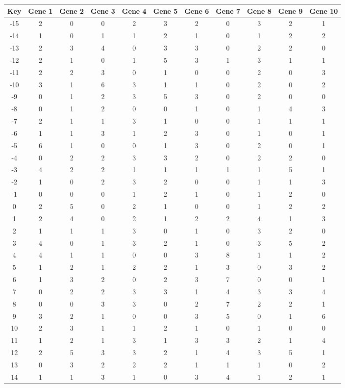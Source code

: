 \begin{tabular}{|c|c|c|c|c|c|c|c|c|c|c|}
\hline
Key & Gene 1 & Gene 2 & Gene 3 & Gene 4 & Gene 5 & Gene 6 & Gene 7 & Gene 8 & Gene 9 & Gene 10 \\
\hline
-15 & 2 & 0 & 0 & 2 & 3 & 2 & 0 & 3 & 2 & 1 \\
-14 & 1 & 0 & 1 & 1 & 2 & 1 & 0 & 1 & 2 & 2 \\
-13 & 2 & 3 & 4 & 0 & 3 & 3 & 0 & 2 & 2 & 0 \\
-12 & 2 & 1 & 0 & 1 & 5 & 3 & 1 & 3 & 1 & 1 \\
-11 & 2 & 2 & 3 & 0 & 1 & 0 & 0 & 2 & 0 & 3 \\
-10 & 3 & 1 & 6 & 3 & 1 & 1 & 0 & 2 & 0 & 2 \\
-9 & 0 & 1 & 2 & 3 & 5 & 3 & 0 & 2 & 0 & 0 \\
-8 & 0 & 1 & 2 & 0 & 0 & 1 & 0 & 1 & 4 & 3 \\
-7 & 2 & 1 & 1 & 3 & 1 & 0 & 0 & 1 & 1 & 1 \\
-6 & 1 & 1 & 3 & 1 & 2 & 3 & 0 & 1 & 0 & 1 \\
-5 & 6 & 1 & 0 & 0 & 1 & 3 & 0 & 2 & 0 & 1 \\
-4 & 0 & 2 & 2 & 3 & 3 & 2 & 0 & 2 & 2 & 0 \\
-3 & 4 & 2 & 2 & 1 & 1 & 1 & 1 & 1 & 5 & 1 \\
-2 & 1 & 0 & 2 & 3 & 2 & 0 & 0 & 1 & 1 & 3 \\
-1 & 0 & 0 & 0 & 1 & 2 & 1 & 0 & 1 & 2 & 0 \\
0 & 2 & 5 & 0 & 2 & 1 & 0 & 0 & 1 & 2 & 2 \\
1 & 2 & 4 & 0 & 2 & 1 & 2 & 2 & 4 & 1 & 3 \\
2 & 1 & 1 & 1 & 3 & 0 & 1 & 0 & 3 & 2 & 0 \\
3 & 4 & 0 & 1 & 3 & 2 & 1 & 0 & 3 & 5 & 2 \\
4 & 4 & 1 & 1 & 0 & 0 & 3 & 8 & 1 & 1 & 2 \\
5 & 1 & 2 & 1 & 2 & 2 & 1 & 3 & 0 & 3 & 2 \\
6 & 1 & 3 & 2 & 0 & 2 & 3 & 7 & 0 & 0 & 1 \\
7 & 0 & 2 & 2 & 3 & 3 & 1 & 4 & 3 & 3 & 4 \\
8 & 0 & 0 & 3 & 3 & 0 & 2 & 7 & 2 & 2 & 1 \\
9 & 3 & 2 & 1 & 0 & 0 & 3 & 5 & 0 & 1 & 6 \\
10 & 2 & 3 & 1 & 1 & 2 & 1 & 0 & 1 & 0 & 0 \\
11 & 1 & 2 & 1 & 3 & 1 & 3 & 3 & 2 & 1 & 4 \\
12 & 2 & 5 & 3 & 3 & 2 & 1 & 4 & 3 & 5 & 1 \\
13 & 0 & 3 & 2 & 2 & 2 & 1 & 1 & 1 & 0 & 2 \\
14 & 1 & 1 & 3 & 1 & 0 & 3 & 4 & 1 & 2 & 1 \\
\hline
\end{tabular}